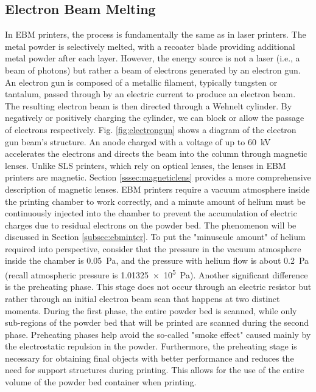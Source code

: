 \subsection{Electron Beam Melting}
\label{subsec:ebm}
In EBM printers, the process is fundamentally the same as in laser printers. The metal powder is selectively melted, with a recoater blade providing additional metal powder after each layer. However, the energy source is not a laser (i.e., a beam of photons) but rather a beam of electrons generated by an electron gun. An electron gun is composed of a metallic filament, typically tungsten or tantalum, passed through by an electric current to produce an electron beam. The resulting electron beam is then directed through a Wehnelt cylinder. By negatively or positively charging the cylinder, we can block or allow the passage of electrons respectively. Fig. \ref{fig:electrongun} shows a diagram of the electron gun beam's structure. An anode charged with a voltage of up to \SI{60}{\kilo\volt} accelerates the electrons and directs the beam into the column through magnetic lenses. Unlike SLS printers, which rely on optical lenses, the lenses in EBM printers are magnetic. Section \ref{sssec:magneticlens} provides a more comprehensive description of magnetic lenses. EBM printers require a vacuum atmosphere inside the printing chamber to work correctly, and a minute amount of helium must be continuously injected into the chamber to prevent the accumulation of electric charges due to residual electrons on the powder bed. The phenomenon will be discussed in Section \ref{subsec:ebminter}. To put the "minuscule amount" of helium required into perspective, consider that the pressure in the vacuum atmosphere inside the chamber is \SI{0.05}{\pascal}, and the pressure with helium flow is about \SI{0,2}{\pascal} (recall atmospheric pressure is \SI{1,01325e5}{\pascal}). Another significant difference is the preheating phase. This stage does not occur through an electric resistor but rather through an initial electron beam scan that happens at two distinct moments. During the first phase, the entire powder bed is scanned, while only sub-regions of the powder bed that will be printed are scanned during the second phase. Preheating phases help avoid the so-called "smoke effect" caused mainly by the electrostatic repulsion in the powder. Furthermore, the preheating stage is necessary for obtaining final objects with better performance and reduces the need for support structures during printing. This allows for the use of the entire volume of the powder bed container when printing. 

